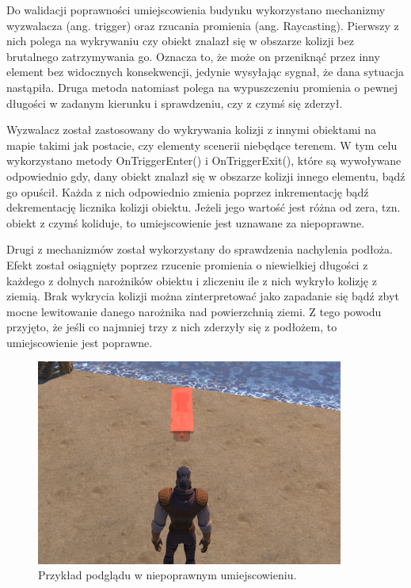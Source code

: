 Do walidacji poprawności umiejscowienia budynku wykorzystano mechanizmy wyzwalacza (ang. trigger) oraz rzucania
promienia (ang. Raycasting). Pierwszy z nich polega na wykrywaniu czy obiekt znalazł się w obszarze kolizji bez
brutalnego zatrzymywania go. Oznacza to, że może on przeniknąć przez inny element bez widocznych konsekwencji, jedynie
wysyłając sygnał, że dana sytuacja nastąpiła. Druga metoda natomiast polega na wypuszczeniu promienia o pewnej długości
w zadanym kierunku i sprawdzeniu, czy z czymś się zderzył.

Wyzwalacz został zastosowany do wykrywania kolizji z innymi obiektami na mapie takimi jak postacie, czy elementy
scenerii niebędące terenem. W tym celu wykorzystano metody OnTriggerEnter() i OnTriggerExit(), które są wywoływane
odpowiednio gdy, dany obiekt znalazł się w obszarze kolizji innego elementu, bądź go opuścił. Każda z nich odpowiednio
zmienia poprzez inkrementację bądź dekrementację licznika kolizji obiektu. Jeżeli jego wartość jest różna od zera, tzn.
obiekt z czymś koliduje, to umiejscowienie jest uznawane za niepoprawne.

Drugi z mechanizmów został wykorzystany do sprawdzenia nachylenia podłoża. Efekt został osiągnięty poprzez rzucenie
promienia o niewielkiej długości z każdego z dolnych narożników obiektu i zliczeniu ile z nich wykryło kolizję z ziemią.
Brak wykrycia kolizji można zinterpretować jako zapadanie się bądź zbyt mocne lewitowanie danego narożnika nad
powierzchnią ziemi. Z tego powodu przyjęto, że jeśli co najmniej trzy z nich zderzyły się z podłożem, to umiejscowienie
jest poprawne.

\begin{figure}[h!]
    \centering
    \includegraphics[width=0.9\textwidth]{images/implementacja/mechanizm_budowania/niepoprawne.png}
    \caption{Przykład podglądu w niepoprawnym umiejscowieniu.}
\end{figure}

